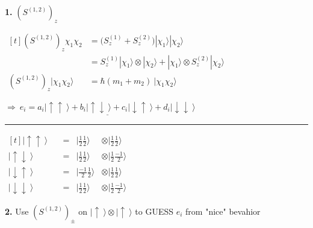 \documentclass[12pt]{article}
\begin{document}
\vspace{20pt} \noindent
\textbf{1.} \(\left( S^{(1,2)} \right)_z\) \\[10pt]
\begin{minipage}[t]{.6\textwidth}
    \( \begin{aligned}[t] 
        \left( S^{(1,2)} \right)_z \chi_1 \chi_2 
            &= \Big( S^{(1)}_z + S^{(2)}_z \Big) 
                | \chi_1 \rangle | \chi_2 \rangle\\[10pt]
        &= S^{(1)}_z | \chi_1 \rangle \otimes | \chi_2 \rangle 
            + | \chi_1 \rangle \otimes S^{(2)}_z | \chi_2 \rangle \\[10pt]
        \left( S^{(1,2)} \right)_z  | \chi_1 \chi_2 \rangle 
            &= \hbar (m_1 + m_2) \ | \chi_1 \chi_2 \rangle
    \end{aligned} \)
    
    \vspace{10pt}
    \( \Rightarrow \ \underline{ e_i = a_i| \uparrow \uparrow \ \rangle + b_i| \uparrow \downarrow \ \rangle +
    c_i| \downarrow \uparrow \ \rangle + d_i| \downarrow \downarrow \ \rangle } \)    
\end{minipage}
\hspace{5pt}
\rule[-95pt]{.5pt}{110pt}
\hspace{.5cm} \hspace{5pt}
\begin{minipage}[t]{3cm}
    \( \begin{aligned}[t]
        | \uparrow \uparrow \ \rangle       \quad &=& | \tfrac{1}{2} \tfrac{1}{2} \rangle 
            &\otimes | \tfrac{1}{2} \tfrac{1}{2} \rangle \\[10pt]
        | \uparrow \downarrow \ \rangle     \quad &=& | \tfrac{1}{2} \tfrac{1}{2} \rangle 
            &\otimes | \tfrac{1}{2} \tfrac{-1}{2} \rangle \\[10pt]
        | \downarrow \uparrow \ \rangle     \quad &=& | \tfrac{-1}{2} \tfrac{1}{2} \rangle 
            &\otimes | \tfrac{1}{2} \tfrac{1}{2} \rangle \\[10pt]
        | \downarrow \downarrow \ \rangle   \quad &=& | \tfrac{1}{2} \tfrac{1}{2} \rangle 
            &\otimes | \tfrac{1}{2} \tfrac{-1}{2} \rangle
    \end{aligned}  \)
\end{minipage}

\newpage \noindent
\textbf{2.} Use \( \left( S^{ (1,2) } \right)_\pm \) on 
    \( | \uparrow \ \rangle \otimes | \uparrow \ \rangle \) to GUESS \(e_i\) from "nice" bevahior 
\end{document}
